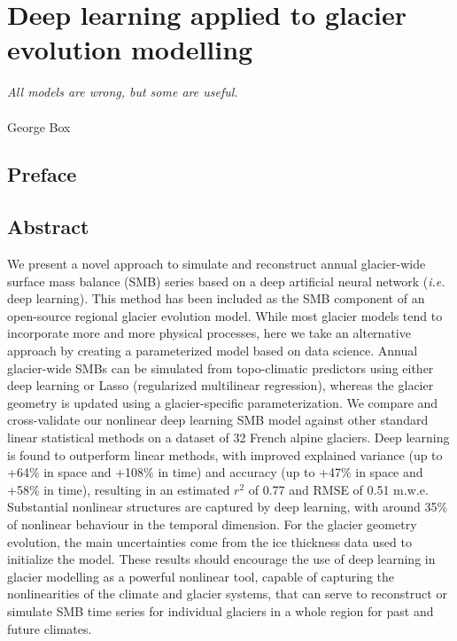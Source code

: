 \chapter{Deep learning applied to glacier evolution modelling}
\label{chap:methods}

\begin{flushright}
\begin{small}
\textit{All models are wrong, but some are useful.}\\ \\
George Box
\end{small}
\end{flushright}

\section*{Preface}

\section{Abstract}
We present a novel approach to simulate and reconstruct annual glacier-wide surface mass balance (SMB) series based on a deep artificial neural network (\textit{i.e.} deep learning). This method has been included as the SMB component of an open-source regional glacier evolution model. While most glacier models tend to incorporate more and more physical processes, here we take an alternative approach by creating a parameterized model based on data science. Annual glacier-wide SMBs can be simulated from topo-climatic predictors using either deep learning or Lasso (regularized multilinear regression), whereas the glacier geometry is updated using a glacier-specific parameterization. We compare and cross-validate our nonlinear deep learning SMB model against other standard linear statistical methods on a dataset of 32 French alpine glaciers. Deep learning is found to outperform linear methods, with improved explained variance (up to +64\% in space and +108\% in time) and accuracy (up to +47\% in space and +58\% in time), resulting in an estimated \(r^2\) of 0.77 and RMSE of 0.51 m.w.e. Substantial nonlinear structures are captured by deep learning, with around 35\% of nonlinear behaviour in the temporal dimension. For the glacier geometry evolution, the main uncertainties come from the ice thickness data used to initialize the model. These results should encourage the use of deep learning in glacier modelling as a powerful nonlinear tool, capable of capturing the nonlinearities of the climate and glacier systems, that can serve to reconstruct or simulate SMB time series for individual glaciers in a whole region for past and future climates. 


